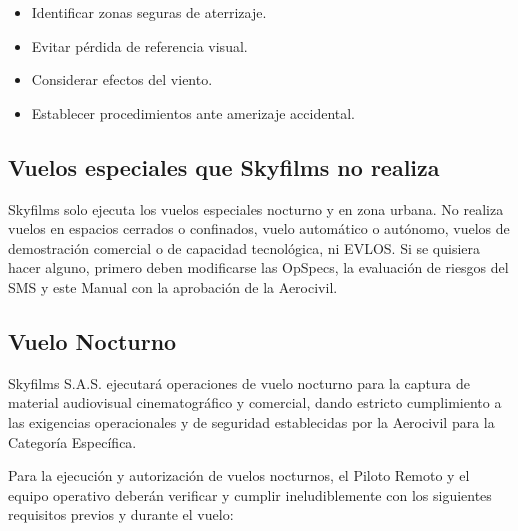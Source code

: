 \begin{itemize}

\item Identificar zonas seguras de aterrizaje.

\item Evitar pérdida de referencia visual.

\item Considerar efectos del viento.

\item Establecer procedimientos ante amerizaje accidental.

\end{itemize}


\subsection{Vuelos especiales que Skyfilms no realiza}

Skyfilms solo ejecuta los vuelos especiales nocturno y en zona urbana. No realiza vuelos en espacios cerrados o confinados, vuelo automático o autónomo, vuelos de demostración comercial o de capacidad tecnológica, ni EVLOS. Si se quisiera hacer alguno, primero deben modificarse las OpSpecs, la evaluación de riesgos del SMS y este Manual con la aprobación de la Aerocivil.

\subsection{Vuelo Nocturno}

Skyfilms S.A.S. ejecutará operaciones de vuelo nocturno para la captura de material audiovisual cinematográfico y comercial, dando estricto cumplimiento a las exigencias operacionales y de seguridad establecidas por la Aerocivil para la Categoría Específica.

Para la ejecución y autorización de vuelos nocturnos, el Piloto Remoto y el equipo operativo deberán verificar y cumplir ineludiblemente con los siguientes requisitos previos y durante el vuelo:

